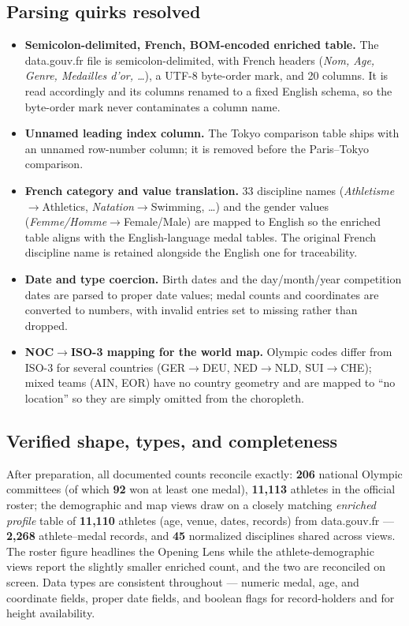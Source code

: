 \documentclass[11pt]{article}
\begin{document}
\subsection{Parsing quirks resolved}
\begin{itemize}
  \item \textbf{Semicolon-delimited, French, BOM-encoded enriched table.} The
        data.gouv.fr file is semicolon-delimited, with French headers
        (\emph{Nom, Age, Genre, Medailles d'or, \ldots}), a UTF-8 byte-order mark,
        and 20 columns. It is read accordingly and its columns renamed to a fixed
        English schema, so the byte-order mark never contaminates a column name.
  \item \textbf{Unnamed leading index column.} The Tokyo comparison table
        ships with an unnamed row-number column; it is removed before the
        Paris--Tokyo comparison.
  \item \textbf{French category and value translation.} 33 discipline names
        (\emph{Athletisme}$\rightarrow$Athletics, \emph{Natation}$\rightarrow$Swimming,
        \ldots) and the gender values (\emph{Femme/Homme}$\rightarrow$Female/Male)
        are mapped to English so the enriched table aligns with the
        English-language medal tables. The original French discipline name is
        retained alongside the English one for traceability.
  \item \textbf{Date and type coercion.} Birth dates and the day/month/year
        competition dates are parsed to proper date values; medal counts and
        coordinates are converted to numbers, with invalid entries set to missing
        rather than dropped.
  \item \textbf{NOC$\rightarrow$ISO-3 mapping for the world map.} Olympic codes
        differ from ISO-3 for several countries (GER$\rightarrow$DEU,
        NED$\rightarrow$NLD, SUI$\rightarrow$CHE); mixed teams (AIN, EOR) have no
        country geometry and are mapped to ``no location'' so they are simply
        omitted from the choropleth.
\end{itemize}

\subsection{Verified shape, types, and completeness}
After preparation, all documented counts reconcile exactly: \textbf{206} national
Olympic committees (of which \textbf{92} won at least one medal), \textbf{11{,}113}
athletes in the official roster; the demographic and map views draw on a closely
matching \emph{enriched profile} table of \textbf{11{,}110} athletes (age, venue,
dates, records) from data.gouv.fr --- \textbf{2{,}268} athlete--medal records, and
\textbf{45} normalized disciplines shared across views. The roster figure headlines the Opening Lens while
the athlete-demographic views report the slightly smaller enriched count, and the two
are reconciled on screen. Data types are consistent throughout --- numeric medal, age,
and coordinate fields, proper date fields, and boolean flags for record-holders and
for height availability.
\end{document}
